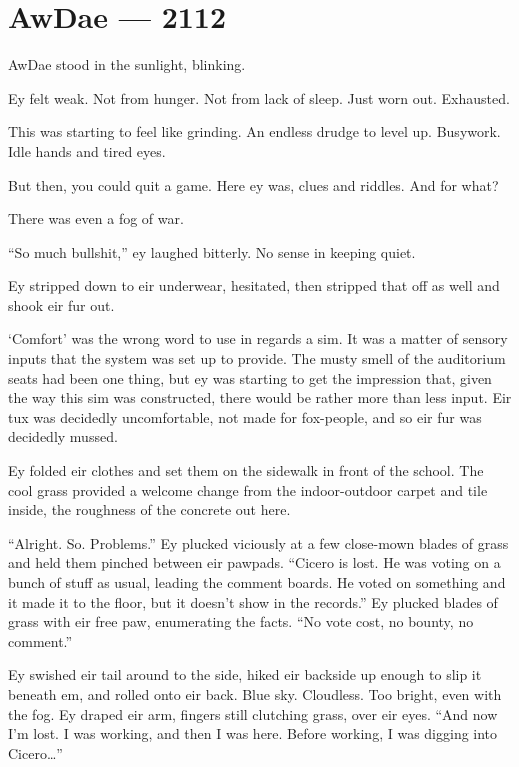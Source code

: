 \hypertarget{rj-brewster-2112}{%
\chapter*{AwDae — 2112}\label{rj-brewster-2112}}

AwDae stood in the sunlight, blinking.

Ey felt weak. Not from hunger. Not from lack of sleep. Just worn out. Exhausted.

This was starting to feel like grinding. An endless drudge to level up. Busywork. Idle hands and tired eyes.

But then, you could quit a game. Here ey was, clues and riddles. And for what?

There was even a fog of war.

``So much bullshit,'' ey laughed bitterly. No sense in keeping quiet.

Ey stripped down to eir underwear, hesitated, then stripped that off as well and shook eir fur out.

`Comfort' was the wrong word to use in regards a sim. It was a matter of sensory inputs that the system was set up to provide. The musty smell of the auditorium seats had been one thing, but ey was starting to get the impression that, given the way this sim was constructed, there would be rather more than less input. Eir tux was decidedly uncomfortable, not made for fox-people, and so eir fur was decidedly mussed.

Ey folded eir clothes and set them on the sidewalk in front of the school. The cool grass provided a welcome change from the indoor-outdoor carpet and tile inside, the roughness of the concrete out here.

``Alright. So. Problems.'' Ey plucked viciously at a few close-mown blades of grass and held them pinched between eir pawpads. ``Cicero is lost. He was voting on a bunch of stuff as usual, leading the comment boards. He voted on something and it made it to the floor, but it doesn't show in the records.'' Ey plucked blades of grass with eir free paw, enumerating the facts. ``No vote cost, no bounty, no comment.''

Ey swished eir tail around to the side, hiked eir backside up enough to slip it beneath em, and rolled onto eir back. Blue sky. Cloudless. Too bright, even with the fog. Ey draped eir arm, fingers still clutching grass, over eir eyes. ``And now I'm lost. I was working, and then I was here. Before working, I was digging into Cicero\ldots{}''

